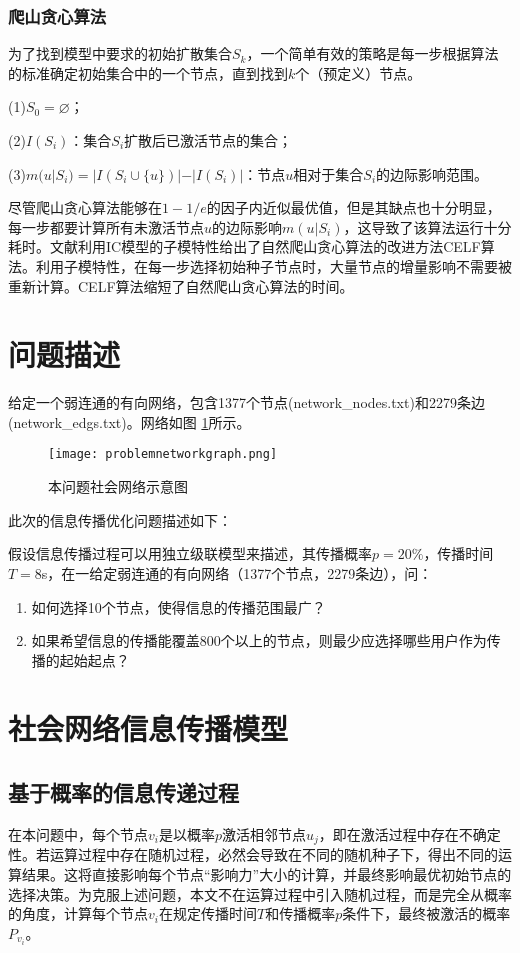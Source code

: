 \documentclass[UTF8]{ctexart}
\newcommand{\upcite}[1]{\textsuperscript{\textsuperscript{\cite{#1}}}}
\begin{document}
\subsubsection{爬山贪心算法}
为了找到模型中要求的初始扩散集合$S_k$，一个简单有效的策略是每一步根据算法的标准确定初始集合中的一个节点，直到找到$k$个（预定义）节点。

(1)$S_0=\varnothing $；

(2)$I(S_i)$：集合$S_i$扩散后已激活节点的集合；

(3)$m(u|S_i)=|I(S_i\cup \{u\})|-|I(S_i)|$：节点$u$相对于集合$S_i$的边际影响范围。

尽管爬山贪心算法能够在$1 - 1/e$的因子内近似最优值，但是其缺点也十分明显，每一步都要计算所有未激活节点$u$的边际影响$m(u|S_i)$，这导致了该算法运行十分耗时。文献\upcite{Chen}利用IC模型的子模特性给出了自然爬山贪心算法的改进方法CELF算法。利用子模特性，在每一步选择初始种子节点时，大量节点的增量影响不需要被重新计算。CELF算法缩短了自然爬山贪心算法的时间。



\section{问题描述}
给定一个弱连通的有向网络，包含1377个节点(network\_nodes.txt)和2279条边(network\_edgs.txt)。网络如图 \ref{problemnetworkgraph}所示。

\begin{figure}[h!]
	\centering
	\texttt{[image: problemnetworkgraph.png]}
	\caption{本问题社会网络示意图}
	\label{problemnetworkgraph}
\end{figure}

此次的信息传播优化问题描述如下：

假设信息传播过程可以用独立级联模型来描述，其传播概率$p=20\%$，传播时间$T=8$s，在一给定弱连通的有向网络（1377个节点，2279条边），问：
\begin{enumerate}
	\item 如何选择10个节点，使得信息的传播范围最广？
	\item 如果希望信息的传播能覆盖800个以上的节点，则最少应选择哪些用户作为传播的起始起点？
\end{enumerate}



\section{社会网络信息传播模型}
\subsection{基于概率的信息传递过程}
在本问题中，每个节点$v_i$是以概率$p$激活相邻节点$u_j$，即在激活过程中存在不确定性。若运算过程中存在随机过程，必然会导致在不同的随机种子下，得出不同的运算结果。这将直接影响每个节点“影响力”大小的计算，并最终影响最优初始节点的选择决策。为克服上述问题，本文不在运算过程中引入随机过程，而是完全从概率的角度，计算每个节点$v_i$在规定传播时间$T$和传播概率$p$条件下，最终被激活的概率$P_{v_i}$。
\end{document}

